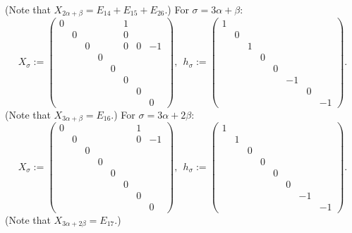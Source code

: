 \documentclass[12pt,letterpaper]{amsart}
\begin{document}
(Note that $X_{2\alpha + \beta} = E_{14}+E_{15}+E_{26}$.) For
$\sigma = 3\alpha+\beta$:
\[
X_{\sigma} :=
\begin{pmatrix} 0& & & & &1& & \\
          &0& & & &0& & \\
          & &0& & &0&0&-1\\
          & & &0& & & & \\
          & & & &0& & & \\
          & & & & &0& & \\
          & & & & & &0& \\
          & & & & & & &0
         \end{pmatrix},\ \
h_{\sigma} := \begin{pmatrix} 1& & & & & & & \\
                          &0& & & & & & \\
                          & &1& & & & & \\
                          & & &0& & & & \\
                          & & & &0& & & \\
                          & & & & &-1& & \\
                          & & & & & &0& \\
                          & & & & & & &-1
                         \end{pmatrix}.
\]
(Note that $X_{3\alpha + \beta} = E_{16}$.) For $\sigma =
3\alpha+2\beta$:
\[
X_{\sigma} :=
\begin{pmatrix} 0& & & & & &1& \\
          &0& & & & &0&-1\\
          & &0& & & & & \\
          & & &0& & & & \\
          & & & &0& & & \\
          & & & & &0& & \\
          & & & & & &0& \\
          & & & & & & &0
         \end{pmatrix},\ \
h_{\sigma} := \begin{pmatrix} 1& & & & & & & \\
                          &1& & & & & & \\
                          & &0& & & & & \\
                          & & &0& & & & \\
                          & & & &0& & & \\
                          & & & & &0& & \\
                          & & & & & &-1& \\
                          & & & & & & &-1
                         \end{pmatrix}.
\]
(Note that $X_{3\alpha+2\beta} = E_{17}$.)
\end{document}
